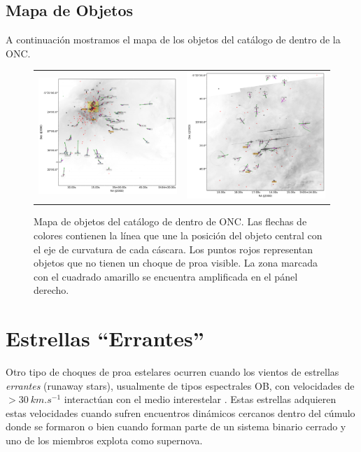 \subsection{Mapa de Objetos}

A continuación mostramos el mapa de los objetos del catálogo de \citet{Gutierrez-Soto:2015a} dentro de la ONC.

\begin{figure}
  \begin{tabular}{cc}
    \includegraphics[width=0.5\linewidth]{./Figures/ll-pos-image-Luis} & \includegraphics[width=0.46\linewidth]{./Figures/ll-pos-image-zoom-Luis}
  \end{tabular}
  \caption{Mapa de objetos del catálogo de \citet{Gutierrez-Soto:2015a} dentro de ONC. Las flechas de colores contienen la línea que une la posición del objeto central con el eje de curvatura de cada cáscara. Los puntos rojos representan objetos que no tienen un choque de proa visible. La zona marcada con el cuadrado amarillo se encuentra amplificada en el pánel derecho.}
  \label{fig:orion-map-LL}
\end{figure}


\section{Estrellas ``Errantes''}

Otro tipo de choques de proa estelares ocurren cuando los vientos de estrellas \textit{errantes} (runaway stars), usualmente de tipos espectrales OB, con velocidades de $ >\SI{30}{km.s^{-1}}$ interactúan con el medio interestelar \citep{Kobulnicky:2016}. Estas estrellas adquieren estas velocidades cuando sufren encuentros dinámicos cercanos dentro del cúmulo donde se formaron o bien cuando forman parte de un sistema binario cerrado y uno de los miembros explota como supernova.

